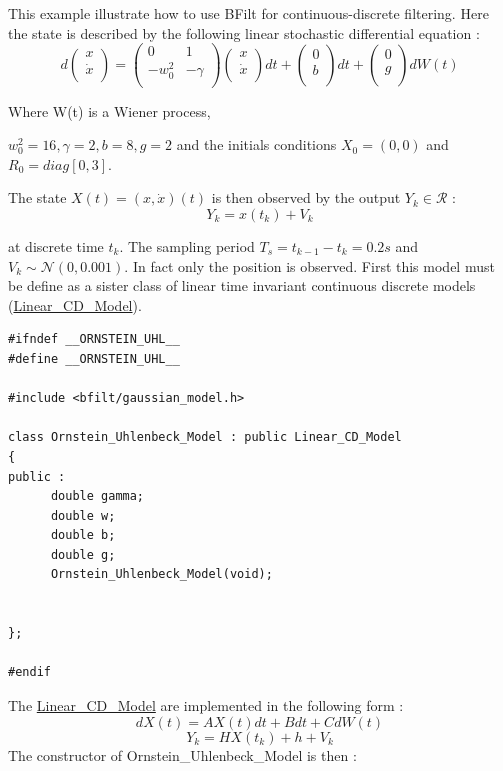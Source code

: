 This example illustrate how to use BFilt for continuous-discrete filtering. Here the state is described by the following linear stochastic differential equation : \[ d \left ( \begin{array}{c} x \\ \dot{x} \\ \end{array} \right ) = \left ( \begin{array}{cc} 0 & 1 \\ -w_0^2 & -\gamma \\ \end{array} \right ) \left ( \begin{array}{c} x \\ \dot{x} \\ \end{array} \right ) dt + \left( \begin{array}{c} 0 \\ b \\ \end{array} \right ) dt + \left ( \begin{array}{c} 0 \\ g \\ \end{array} \right ) dW(t) \]

Where W(t) is a Wiener process,

$ w_0^2=16, \gamma = 2, b=8, g=2$ and the initials conditions $ X_0=(0,0) $ and $ R_0=diag[0,3]$.

The state $ X(t) = (x,\dot{x})(t)$ is then observed by the output $ Y_k \in \mathcal{R} $ : \[ Y_k = x(t_k) + V_k \]

at discrete time $ t_k $. The sampling period $ T_s = t_{k-1} - t_k = 0.2s $ and $ V_k \sim \mathcal{N}(0,0.001) $. In fact only the position is observed. First this model must be define as a sister class of linear time invariant continuous discrete models (\hyperlink{class_linear___c_d___model}{Linear\_\-CD\_\-Model}). 

\begin{DocInclude}\begin{verbatim}#ifndef __ORNSTEIN_UHL__
#define __ORNSTEIN_UHL__

#include <bfilt/gaussian_model.h>

class Ornstein_Uhlenbeck_Model : public Linear_CD_Model
{
public :
      double gamma;
      double w;
      double b;
      double g;
      Ornstein_Uhlenbeck_Model(void);


};

#endif
\end{verbatim}
\end{DocInclude}
 The \hyperlink{class_linear___c_d___model}{Linear\_\-CD\_\-Model} are implemented in the following form : \[ dX(t) = A X(t)dt + Bdt + C dW(t) \] \[ Y_k = H X(t_k) + h + V_k \] The constructor of Ornstein\_\-Uhlenbeck\_\-Model is then : 


